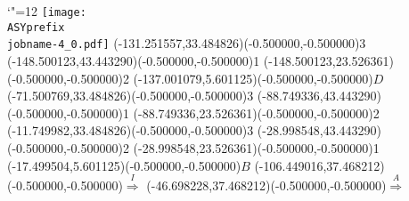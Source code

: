 \setlength{\unitlength}{1pt}
\makeatletter%
\let\ASYencoding\f@encoding%
\let\ASYfamily\f@family%
\let\ASYseries\f@series%
\let\ASYshape\f@shape%
\makeatother%
{\catcode`"=12%
\texttt{[image: \\ASYprefix\\jobname-4\_0.pdf]}%
}%
\color{ASYcolor}
\fontsize{12.000000}{14.400000}\selectfont
\usefont{\ASYencoding}{\ASYfamily}{\ASYseries}{\ASYshape}%
\ASYalign(-131.251557,33.484826)(-0.500000,-0.500000){3}%
\color{ASYcolor}
\fontsize{12.000000}{14.400000}\selectfont
\ASYalign(-148.500123,43.443290)(-0.500000,-0.500000){1}%
\color{ASYcolor}
\fontsize{12.000000}{14.400000}\selectfont
\ASYalign(-148.500123,23.526361)(-0.500000,-0.500000){2}%
\color{ASYcolor}
\fontsize{12.000000}{14.400000}\selectfont
\ASYalign(-137.001079,5.601125)(-0.500000,-0.500000){$D$}%
\color{ASYcolor}
\fontsize{12.000000}{14.400000}\selectfont
\ASYalign(-71.500769,33.484826)(-0.500000,-0.500000){3}%
\color{ASYcolor}
\fontsize{12.000000}{14.400000}\selectfont
\ASYalign(-88.749336,43.443290)(-0.500000,-0.500000){1}%
\color{ASYcolor}
\fontsize{12.000000}{14.400000}\selectfont
\ASYalign(-88.749336,23.526361)(-0.500000,-0.500000){2}%
\color{ASYcolor}
\fontsize{12.000000}{14.400000}\selectfont
\ASYalign(-11.749982,33.484826)(-0.500000,-0.500000){3}%
\color{ASYcolor}
\fontsize{12.000000}{14.400000}\selectfont
\ASYalign(-28.998548,43.443290)(-0.500000,-0.500000){2}%
\color{ASYcolor}
\fontsize{12.000000}{14.400000}\selectfont
\ASYalign(-28.998548,23.526361)(-0.500000,-0.500000){1}%
\color{ASYcolor}
\fontsize{12.000000}{14.400000}\selectfont
\ASYalign(-17.499504,5.601125)(-0.500000,-0.500000){$B$}%
\color{ASYcolor}
\fontsize{12.000000}{14.400000}\selectfont
\ASYalign(-106.449016,37.468212)(-0.500000,-0.500000){$\stackrel{I}{\Longrightarrow}$}%
\color{ASYcolor}
\fontsize{12.000000}{14.400000}\selectfont
\ASYalign(-46.698228,37.468212)(-0.500000,-0.500000){$\stackrel{A}{\Longrightarrow}$}%
